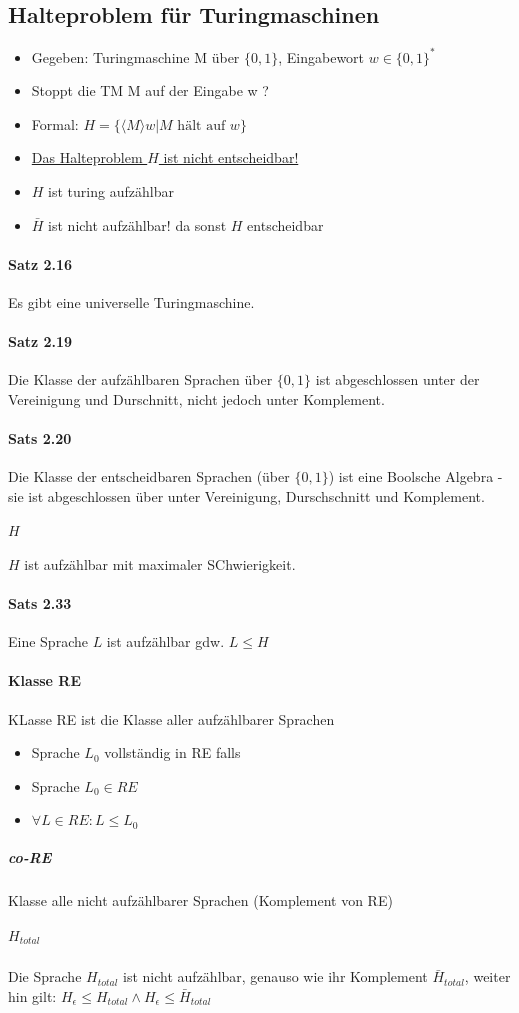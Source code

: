 \documentclass[a4paper, 10pt]{article}
\theoremstyle{definition}
\newcommand{\goedl}[1]{\langle {#1}\rangle}
\begin{document}
\subsection{Halteproblem für Turingmaschinen}
\begin{itemize}
    \item Gegeben: Turingmaschine M über $\{0,1\}$, Eingabewort $w\in\{0,1\}^*$
    \item Stoppt die TM M auf der Eingabe w ?
    \item Formal: $H=\{\goedl{M}w|M\text{ hält auf }w\}$
    \item \underline{Das Halteproblem $H$ ist nicht entscheidbar!}
    \item $H$ ist turing aufzählbar
    \item $\bar{H}$ ist nicht aufzählbar! da sonst $H$ entscheidbar
\end{itemize}

\paragraph{Satz 2.16} Es gibt eine universelle Turingmaschine.
\paragraph{Satz 2.19} Die Klasse der aufzählbaren Sprachen über $\{0,1\}$ ist abgeschlossen unter der Vereinigung und Durschnitt, nicht jedoch unter Komplement.
\paragraph{Sats 2.20} Die Klasse der entscheidbaren Sprachen (über $\{0,1\}$) ist eine Boolsche Algebra - sie ist abgeschlossen über unter Vereinigung, Durschschnitt und Komplement.
\paragraph{$H$}$H$ ist aufzählbar mit maximaler SChwierigkeit.
\paragraph{Sats 2.33} Eine Sprache $L$ ist aufzählbar gdw. $L\leq H$
\paragraph{Klasse RE} KLasse RE ist die Klasse aller aufzählbarer Sprachen\begin{itemize}
    \item Sprache $L_0$ vollständig in RE falls
    \item Sprache $L_0\in RE$ 
    \item $\forall L \in RE:L\leq L_0$
\end{itemize}
\subparagraph{co-RE} Klasse alle nicht aufzählbarer Sprachen (Komplement von RE)
\subparagraph{$H_{total}$} Die Sprache $H_{total}$ ist nicht aufzählbar, genauso wie ihr Komplement $\bar{H}_{total}$, weiter hin gilt: $H_\epsilon\leq H_{total}\land H_\epsilon\leq\bar{H}_{total}$
\end{document}
